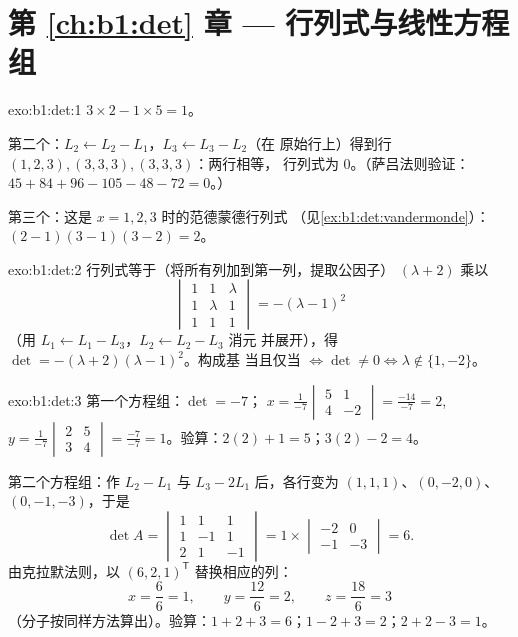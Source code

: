 \section*{第 \ref{ch:b1:det} 章 --- 行列式与线性方程组}

\begin{solution}{exo:b1:det:1}
$3 \times 2 - 1 \times 5 = 1$。

第二个：$L_2 \leftarrow L_2 - L_1$，$L_3 \leftarrow L_3 - L_2$（在
原始行上）得到行 $(1,2,3), (3,3,3), (3,3,3)$：两行相等，
行列式为 $0$。（萨吕法则验证：$45 + 84 + 96 - 105 - 48 -
72 = 0$。）

第三个：这是 $x = 1, 2, 3$ 时的范德蒙德行列式
（见\cref{ex:b1:det:vandermonde}）：$(2-1)(3-1)(3-2) = 2$。
\end{solution}

\begin{solution}{exo:b1:det:2}
行列式等于（将所有列加到第一列，提取公因子）
$(\lambda + 2)$ 乘以
\[
\begin{vmatrix}
1 & 1 & \lambda\\ 1 & \lambda & 1\\ 1 & 1 & 1
\end{vmatrix}
= -(\lambda - 1)^2
\]
（用 $L_1 \leftarrow L_1 - L_3$，$L_2 \leftarrow L_2 - L_3$ 消元
并展开），得 $\det = -(\lambda+2)(\lambda-1)^2$。构成基
当且仅当 $\iff \det \neq 0 \iff \lambda \notin \{1, -2\}$。
\end{solution}

\begin{solution}{exo:b1:det:3}
第一个方程组：$\det = -7$；
$x = \frac{1}{-7}\begin{vmatrix} 5 & 1\\ 4 & -2\end{vmatrix}
= \frac{-14}{-7} = 2$,
$y = \frac{1}{-7}\begin{vmatrix} 2 & 5\\ 3 & 4\end{vmatrix}
= \frac{-7}{-7} = 1$。验算：$2(2) + 1 = 5$；$3(2) - 2 = 4$。

第二个方程组：作 $L_2 - L_1$ 与 $L_3 - 2L_1$ 后，各行变为
$(1,1,1)$、$(0,-2,0)$、$(0,-1,-3)$，于是
\[
\det A = \begin{vmatrix} 1&1&1\\ 1&-1&1\\ 2&1&-1\end{vmatrix}
= 1 \times \begin{vmatrix} -2 & 0\\ -1 & -3\end{vmatrix} = 6 .
\]
由克拉默法则，以 $(6,2,1)^{\mathsf T}$ 替换相应的列：
\[
x = \frac{6}{6} = 1, \qquad
y = \frac{12}{6} = 2, \qquad
z = \frac{18}{6} = 3
\]
（分子按同样方法算出）。验算：$1 + 2 + 3 = 6$；$1 -
2 + 3 = 2$；$2 + 2 - 3 = 1$。
\end{solution}

